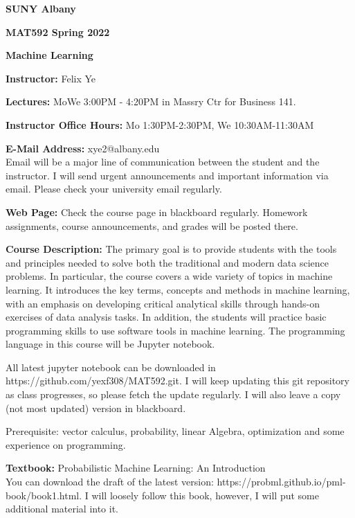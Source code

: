 \documentclass[a4paper,10pt]{article}
\begin{document}
\begin{center}

\textbf{SUNY Albany}

\textbf{MAT592 Spring 2022}

\textbf{Machine Learning}


\end{center}

\textbf{Instructor:} Felix Ye 

\textbf{Lectures:} MoWe 3:00PM - 4:20PM  in Massry Ctr for Business 141.

\textbf{Instructor Office Hours:}  Mo 1:30PM-2:30PM, We 10:30AM-11:30AM


\textbf{E-Mail Address:} xye2@albany.edu\\
Email will be a major line of communication between the student and the instructor. I will send urgent announcements and important information via email. Please check your university email regularly.

\textbf{Web Page:}
Check the course page in blackboard regularly. Homework assignments, course announcements, and grades will be posted there.


\textbf{Course Description:} The primary goal is to provide students with the tools and principles needed to solve both the traditional and modern data science problems. In particular, the course covers a wide variety of topics in machine learning. It introduces the key terms, concepts and methods in machine learning, with an emphasis on developing critical analytical skills through hands-on exercises of data analysis tasks. In addition, the students will practice basic programming skills to use software tools in machine learning. The programming language in this course will be Jupyter notebook. 

All latest jupyter notebook can be downloaded in https://github.com/yexf308/MAT592.git. I will keep updating this git repository as class progresses, so please fetch the update regularly. I will also leave a copy (not most updated) version in blackboard. 

 Prerequisite: vector calculus, probability, linear Algebra, optimization and some experience on programming. 
 

\textbf{Textbook:} Probabilistic Machine Learning: An Introduction \\
You can download the draft of the latest version: https://probml.github.io/pml-book/book1.html. 
 I will loosely follow this book, however, I will put some additional material into it.
\end{document}
